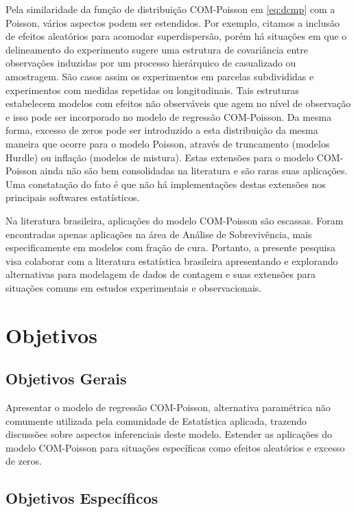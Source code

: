 \documentclass[
12pt,				%
openright,			%
oneside,			%
a4paper,			%
english,			%
brazil,				%
]{abntex2}
\begin{document}
Pela similaridade da função de distribuição COM-Poisson em \ref{eq:dcmp}
com a Poisson, vários aspectos podem ser estendidos. Por exemplo,
citamos 
a inclusão de efeitos aleatórios para acomodar superdispersão, porém há
situações em que o delineamento do experimento sugere uma estrutura de
covariância entre observações induzidas por um processo hierárquico de
casualizado ou amostragem. São casos assim os experimentos em parcelas
subdivididas e experimentos com medidas repetidas ou longitudinais. Tais
estruturas estabelecem modelos com efeitos não observáveis que agem no
nível de observação e isso pode ser incorporado no modelo de regressão
COM-Poisson. Da mesma forma, excesso
de zeros pode ser introduzido a esta distribuição da mesma maneira
que ocorre para o modelo Poisson, através de truncamento (modelos
Hurdle) ou inflação (modelos de mistura). Estas extensões para o
modelo COM-Poisson ainda não são bem consolidadas na literatura e são
raras 
suas aplicações. Uma constatação do fato é que não há implementações
destas extensões nos principais softwares estatísticos.

Na literatura brasileira, aplicações do modelo COM-Poisson são
escassas. Foram encontradas apenas aplicações na área de Análise de
Sobrevivência, mais especificamente em modelos com fração de
cura. Portanto, a presente pesquisa visa colaborar com a literatura
estatística brasileira apresentando e explorando alternativas para
modelagem de dados de contagem e suas extensões para situações comuns em
estudos experimentais e observacionais.

\chapter{Objetivos}
\label{cha:objetivos}

\section{Objetivos Gerais}
\label{sec:objetivosgerais}

Apresentar o modelo de regressão COM-Poisson, alternativa paramétrica
não comumente utilizada pela comunidade de Estatística aplicada,
trazendo discussões sobre aspectos inferenciais deste modelo. Estender
as aplicações do modelo COM-Poisson para situações específicas como
efeitos aleatórios e excesso de zeros.

\section{Objetivos Específicos}
\label{sec:objetivosespecificos}
\end{document}
